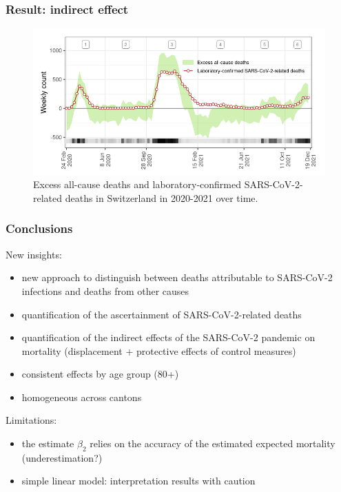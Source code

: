 \documentclass[10pt]{beamer}
\begin{document}
\begin{frame}
\frametitle{Result:  indirect effect}

	\begin{figure}[t]
		\includegraphics[width=\linewidth ]{visual_comp_fig.png}
		\caption{Excess all-cause deaths and laboratory-confirmed SARS-CoV-2-related deaths in Switzerland in 2020-2021 over time.}
		
	\end{figure}
\end{frame}



\begin{frame}
\frametitle{Conclusions}
\alert{New insights}:
\begin{itemize}
	\item new approach to distinguish between deaths attributable to SARS-CoV-2 infections and deaths from other causes
	\item quantification of the \alert{ascertainment} of SARS-CoV-2-related deaths
	\item quantification of the \alert{indirect effects} of the SARS-CoV-2 pandemic on mortality (displacement + protective effects of control measures)
	\item consistent effects by age group (80+)
	\item homogeneous across cantons
\end{itemize} \bigskip


\alert{Limitations}:
\begin{itemize}
\item the estimate $\beta_2$ relies on the accuracy of the estimated expected mortality (underestimation?)
\item simple linear model: interpretation results with caution
\end{itemize}

\end{frame}
\end{document}
